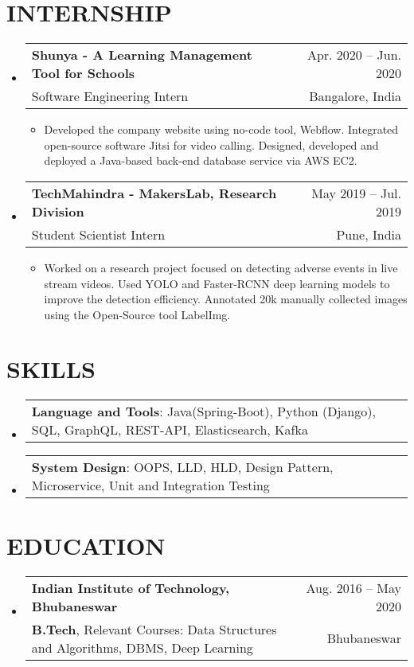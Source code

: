 \documentclass[letterpaper,11pt]{article}
\makeatletter
\newcommand{\resumeSubHeadingListStart}{\begin{itemize}[leftmargin=0in, label={}]}
\newcommand{\resumeSubHeadingListEnd}{\end{itemize}}
\newcommand{\resumeSubHeadingListStartForSkills}{\begin{itemize}[leftmargin=0in, label={}]}
\newcommand{\resumeSubHeadingListEndForSkills}{\end{itemize}\vspace{-5pt}}
\newcommand{\resumeItemListStart}{\begin{itemize}}
\newcommand{\resumeItemListEnd}{\end{itemize}\vspace{-5pt}}
\newcommand{\resumeItem}[1]{
    \item\small{
            {#1 \vspace{-1pt}}
    }
}
\newcommand{\resumeSubheading}[4]{
    \vspace{-1pt}\item
    \begin{tabular*}{\textwidth}[t]{l@{\extracolsep{\fill}}r}
    \textbf{#1} & {\color{dark-grey}\small #2}\vspace{1pt}\\ %
    {#3} & {\color{dark-grey} \small #4}\\ %
    \end{tabular*}\vspace{-7pt}
}
\newcommand{\resumeSubSubheadingForSkills}[2]{
    \item
    \begin{tabular*}{\textwidth}{l@{\extracolsep{\fill}}r}
    \small#1 & \small #2 \\
    \end{tabular*}\vspace{-7pt}
}
\makeatother
\begin{document}
\section{INTERNSHIP}
\resumeSubHeadingListStart
\resumeSubheading
{Shunya - A Learning Management Tool for Schools}{Apr. 2020 -- Jun. 2020}
{Software Engineering Intern}{Bangalore, India}
\resumeItemListStart
\resumeItem{Developed the company website using no-code tool, Webflow. Integrated open-source software Jitsi for video calling. Designed, developed and deployed a Java-based back-end database service via AWS EC2.}
\resumeItemListEnd
\resumeSubheading
{TechMahindra - MakersLab, Research Division}{May 2019 -- Jul. 2019}
{Student Scientist Intern}{Pune, India}
\resumeItemListStart
\resumeItem{Worked on a research project focused on detecting adverse events in live stream videos. Used YOLO and Faster-RCNN deep learning models to improve the detection efficiency. Annotated 20k manually collected images using the Open-Source tool LabelImg.}
\resumeItemListEnd
\resumeSubHeadingListEnd
\section{SKILLS}
\resumeSubHeadingListStartForSkills
\resumeSubSubheadingForSkills
{\textbf{Language and Tools}: Java(Spring-Boot), Python (Django), SQL, GraphQL, REST-API, Elasticsearch, Kafka}{}{}{}{}
\resumeSubSubheadingForSkills
{\textbf{System Design}: OOPS, LLD, HLD, Design Pattern, Microservice, Unit and Integration Testing}{}{}{}{}
\resumeSubHeadingListEndForSkills

\section {EDUCATION}
\resumeSubHeadingListStart
\resumeSubheading
{Indian Institute of Technology, Bhubaneswar}{Aug. 2016 -- May 2020}
{\textbf{B.Tech}, Relevant Courses: Data Structures and Algorithms, DBMS, Deep Learning}{Bhubaneswar}
\resumeSubHeadingListEnd
\end{document}
